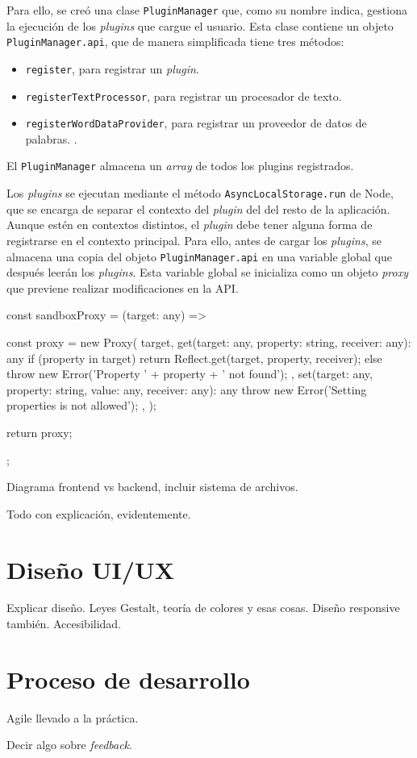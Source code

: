 Para ello, se creó una clase \texttt{PluginManager} que, como su nombre indica, gestiona la ejecución de los \textit{plugins} que cargue el usuario. Esta clase contiene un objeto \texttt{PluginManager.api}, que de manera simplificada tiene tres métodos:

\begin{itemize}
	\item \texttt{register}, para registrar un \textit{plugin}.
	\item \texttt{registerTextProcessor}, para registrar un procesador de texto.
	\item \texttt{registerWordDataProvider}, para registrar un proveedor de datos de palabras. .	
\end{itemize}

El \texttt{PluginManager} almacena un \textit{array} de todos los plugins registrados.

Los \textit{plugins} se ejecutan mediante el método \texttt{AsyncLocalStorage.run} de Node, que se encarga de separar el contexto del \textit{plugin} del del resto de la aplicación. Aunque estén en contextos distintos, el \textit{plugin} debe tener alguna forma de registrarse en el contexto principal. Para ello, antes de cargar los \textit{plugins}, se almacena una copia del objeto \texttt{PluginManager.api} en una variable global que después leerán los \textit{plugins}. Esta variable global se inicializa como un objeto \textit{proxy} que previene realizar modificaciones en la API.

\begin{center}
\begin{typescript}
const sandboxProxy = (target: any) => {
	const proxy = new Proxy(
		target,
		{
			get(target: any, property: string, receiver: any): any
			{
				if (property in target)
				{
					return Reflect.get(target, property, receiver);
				}
				else
				{
					throw new Error('Property ' + property + ' not found');
				}
			},
			set(target: any, property: string, value: any, receiver: any): any
			{
				throw new Error('Setting properties is not allowed');
			},
		}
	);
	
	return proxy;
};
\end{typescript}
\end{center}

Diagrama frontend vs backend, incluir sistema de archivos.

Todo con explicación, evidentemente.

\section{Diseño UI/UX}

Explicar diseño. Leyes Gestalt, teoría de colores y esas cosas. Diseño responsive también. Accesibilidad.

\section{Proceso de desarrollo}

Agile llevado a la práctica.

Decir algo sobre \textit{feedback}.
